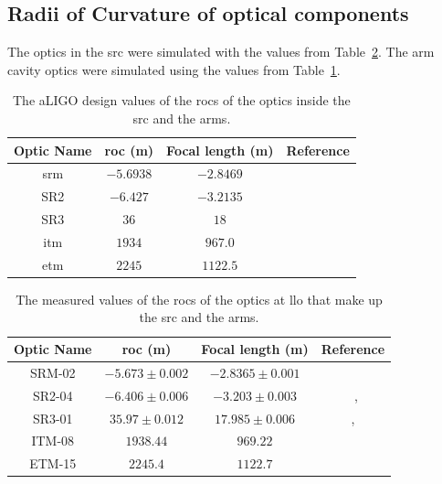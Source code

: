 \subsection{Radii of Curvature of optical components}
The optics in the \gls{src} were simulated with the values from Table~\ref{tab:measured_vals_RoCs}. The arm cavity optics were simulated using the values from Table~\ref{tab:desgin_vals_RoCs}.
\begin{table}[ht]
	\centering
	\begin{tabular}[h]{ c | c | c | c }
		Optic Name & \gls{roc} (m) & Focal length (m) & Reference \\
		\hline
		\gls{srm} &  $-5.6938$ &  $-2.8469$ &~\cite{Muzammil2016} \\
		SR2 &  $-6.427$ &  $-3.2135$ &~\cite{Muzammil2016} \\
		SR3 & $36$ &  $18$ &~\cite{Muzammil2016} \\
		\gls{itm} &  $1934$ &  $967.0$ &~\cite{Muzammil2016} \\
		\gls{etm} &  $2245$ &  $1122.5$ &~\cite{Muzammil2016} \\
	\end{tabular}
	\caption[The aLIGO design values of the radii of curvature of the optics inside the signal recycling cavity and the arms.]{The aLIGO design values of the \glspl{roc} of the optics inside the \gls{src} and the arms.}
	\label{tab:desgin_vals_RoCs}
\end{table}
\begin{table}[ht]
	\centering
	\begin{tabular}[h]{ c | c | c | c }
		Optic Name & \gls{roc} (m) & Focal length (m) & Reference \\
		\hline
		SRM-02 &  $-5.673 \pm 0.002$ & $-2.8365 \pm 0.001 $ &~\cite{galaxy_optics} \\
		SR2-04 &  $-6.406 \pm 0.006 $ &  $-3.203 \pm 0.003 $ &~\cite{SR2_04_measurement},\cite{galaxy_optics} \\
		SR3-01 & $35.97 \pm 0.012 $ &  $17.985 \pm 0.006$ &~\cite{SR3_01_figure_measurement},~\cite{galaxy_optics} \\
		ITM-08 &  $1938.44$ &  $969.22$  &~\cite{galaxy_optics} \\
		ETM-15 &  $2245.4$ & $1122.7$ &~\cite{galaxy_optics} \\
	\end{tabular}
	\caption[The measured values of the radii of curvature of the optics at LLO that make up the signal recycling cavity and the arms.]{The measured values of the \glspl{roc} of the optics at \gls{llo} that make up the \gls{src} and the arms.}
	\label{tab:measured_vals_RoCs}
\end{table}

